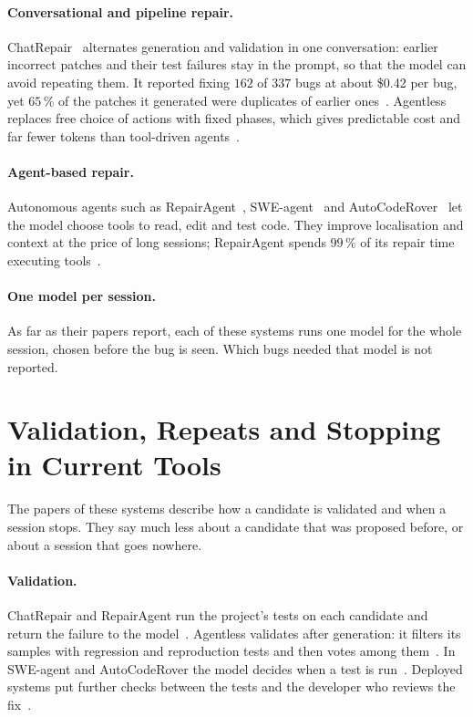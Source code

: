 \paragraph{Conversational and pipeline repair.} ChatRepair~\citep{xia2024chatrepair}
alternates generation and validation in one conversation: earlier incorrect
patches and their test failures stay in the prompt, so that the model can
avoid repeating them. It reported fixing $162$ of $337$ bugs at about \$0.42
per bug, yet $65\,\%$ of the patches it generated were duplicates of earlier
ones~\citep{chen2025conversational}. Agentless~\citep{xia2025agentless}
replaces free choice of actions with fixed phases, which gives predictable
cost and far fewer tokens than tool-driven agents~\citep{yang2025llmrepairsurvey}.

\paragraph{Agent-based repair.} Autonomous agents such as
RepairAgent~\citep{bouzenia2025repairagent},
SWE-agent~\citep{yang2024sweagent} and
AutoCodeRover~\citep{zhang2024autocoderover} let the model choose
tools to read, edit and test code. They improve localisation and context at
the price of long sessions; RepairAgent spends $99\,\%$ of its repair
time executing tools~\citep{bouzenia2025repairagent}.

\paragraph{One model per session.} As far as their papers report, each of
these systems runs one model for the whole session, chosen before the bug is
seen. Which bugs needed that model is not reported.

\section{Validation, Repeats and Stopping in Current Tools}
\label{sec:rel-practice}

The papers of these systems describe how a candidate is validated and when a
session stops. They say much less about a candidate that was proposed before,
or about a session that goes nowhere.

\paragraph{Validation.} ChatRepair and RepairAgent run the project's tests on
each candidate and return the failure to the
model~\citep{xia2024chatrepair,bouzenia2025repairagent}. Agentless validates
after generation: it filters its samples with regression and reproduction
tests and then votes among them~\citep{xia2025agentless}. In SWE-agent and
AutoCodeRover the model decides when a test is
run~\citep{yang2024sweagent,zhang2024autocoderover}. Deployed systems put
further checks between the tests and the developer who reviews the
fix~\citep{marginean2019sapfix,maddila2025agentic,rondon2025passerine}.


